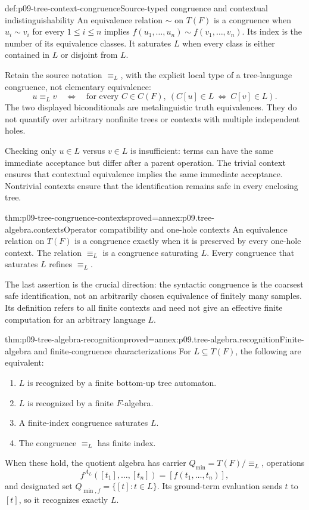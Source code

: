 \begin{hbdefinition}{def:p09-tree-context-congruence}{Source-typed congruence and contextual indistinguishability}
An equivalence relation \(\sim\) on \(T(F)\) is a congruence when
\(u_i\sim v_i\) for every \(1\leq i\leq n\) implies
\(f(u_1,\ldots,u_n)\sim f(v_1,\ldots,v_n)\).
Its index is the number of its equivalence classes.
It saturates \(L\) when every class is either contained in \(L\)
or disjoint from \(L\).

Retain the source notation \(\equiv_L\), with the explicit local type
of a tree-language congruence, not elementary equivalence:
\[
 u\equiv_L v
 \quad\Longleftrightarrow\quad
 \text{for every }C\in C(F),\
           (C[u]\in L\ \Longleftrightarrow\ C[v]\in L).
\]
The two displayed biconditionals are metalinguistic truth equivalences.
They do not quantify over arbitrary nonfinite trees or contexts with
multiple independent holes.
\end{hbdefinition}

Checking only \(u\in L\) versus \(v\in L\) is insufficient:
terms can have the same immediate acceptance but differ after a parent
operation. The trivial context ensures that contextual equivalence implies
the same immediate acceptance. Nontrivial contexts ensure that the
identification remains safe in every enclosing tree.

\begin{hblemma}{thm:p09-tree-congruence-contexts}{proved=annex:p09.tree-algebra.contexts}{Operator compatibility and one-hole contexts}
An equivalence relation on \(T(F)\) is a congruence exactly when it is
preserved by every one-hole context. The relation \(\equiv_L\) is a
congruence saturating \(L\). Every congruence that saturates \(L\)
refines \(\equiv_L\).
\end{hblemma}

The last assertion is the crucial direction: the syntactic congruence is
the coarsest safe identification, not an arbitrarily chosen equivalence
of finitely many samples. Its definition refers to all finite contexts
and need not give an effective finite computation for an arbitrary
language \(L\).

\begin{hbtheorem}{thm:p09-tree-algebra-recognition}{proved=annex:p09.tree-algebra.recognition}{Finite-algebra and finite-congruence characterizations}
For \(L\subseteq T(F)\), the following are equivalent:
\begin{enumerate}
\item \(L\) is recognized by a finite bottom-up tree automaton.
\item \(L\) is recognized by a finite \(F\)-algebra.
\item A finite-index congruence saturates \(L\).
\item The congruence \(\equiv_L\) has finite index.
\end{enumerate}
When these hold, the quotient algebra has carrier
\(Q_{\min}=T(F)/{\equiv_L}\), operations
\[
 f^{A_L}([t_1],\ldots,[t_n])=[f(t_1,\ldots,t_n)],
\]
and designated set \(Q_{\min,f}=\{[t]:t\in L\}\).
Its ground-term evaluation sends \(t\) to \([t]\), so it recognizes
exactly \(L\).
\end{hbtheorem}

